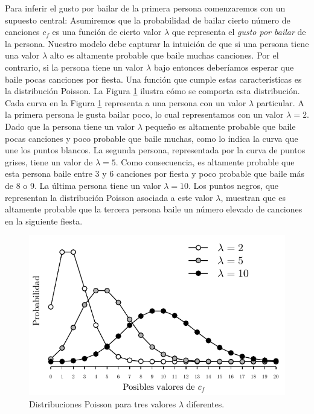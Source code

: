 \documentclass{article}
\begin{document}
\indent Para inferir el gusto por bailar de la primera persona comenzaremos con un supuesto central: Asumiremos que la probabilidad de bailar cierto número de canciones $c_f$ es una función de cierto valor $\lambda$ que representa el \emph{gusto por bailar} de la persona. Nuestro modelo debe capturar la intuición de que si una persona tiene una valor $\lambda$ alto es altamente probable que baile muchas canciones. Por el contrario, si la persona tiene un valor $\lambda$ bajo entonces deberíamos esperar que baile pocas canciones por fiesta. Una función que cumple estas características es la distribución Poisson. La Figura \ref{fig:Poisson} ilustra cómo se comporta esta distribución. Cada curva en la Figura \ref{fig:Poisson} representa a una persona con un valor $\lambda$ particular. A la primera persona le gusta bailar poco, lo cual representamos con un valor $\lambda=2$. Dado que la persona tiene un valor $\lambda$ pequeño es altamente probable que baile pocas canciones y poco probable que baile muchas, como lo indica la curva que une los puntos blancos. La segunda persona, representada por la curva de puntos grises, tiene un valor de $\lambda=5$. Como consecuencia, es altamente probable que esta persona baile entre 3 y 6 canciones por fiesta y poco probable que baile más de 8 o 9. La última persona tiene un valor $\lambda=10$. Los puntos negros, que representan la distribución Poisson asociada a este valor $\lambda$, muestran que es altamente probable que la tercera persona baile un número elevado de canciones en la siguiente fiesta. \\

\begin{figure}[H]
	\centering
	\setlength\fboxsep{0pt}
	\setlength\fboxrule{0.5pt}
	\includegraphics[trim=0cm 0cm 0cm 0cm, clip=true, width=.7\textwidth]	{poisson.pdf}
	\caption{Distribuciones Poisson para tres valores $\lambda$ diferentes.}
	\label{fig:Poisson}
	\end{figure}
\end{document}
